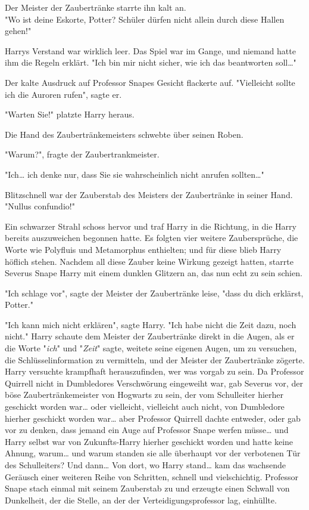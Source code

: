 {Der Meister der Zaubertränke starrte ihn kalt an.\\ "Wo ist deine Eskorte, Potter? Schüler dürfen nicht allein durch diese Hallen gehen!"

Harrys Verstand war wirklich leer. Das Spiel war im Gange, und niemand hatte ihm die Regeln erklärt. "Ich bin mir nicht sicher, wie ich das beantworten soll…"

Der kalte Ausdruck auf Professor Snapes Gesicht flackerte auf. "Vielleicht sollte ich die Auroren rufen", sagte er.

"Warten Sie!" platzte Harry heraus.

Die Hand des Zaubertränkemeisters schwebte über seinen Roben.

"Warum?", fragte der Zaubertrankmeister.

"Ich… ich denke nur, dass Sie sie wahrscheinlich nicht anrufen sollten…"

Blitzschnell war der Zauberstab des Meisters der Zaubertränke in seiner Hand.\\ "Nullus confundio!"

Ein schwarzer Strahl schoss hervor und traf Harry in die Richtung, in die Harry bereits auszuweichen begonnen hatte. Es folgten vier weitere Zaubersprüche, die Worte wie Polyfluis und Metamorphus enthielten; und für diese blieb Harry höflich stehen. Nachdem all diese Zauber keine Wirkung gezeigt hatten, starrte Severus Snape Harry mit einem dunklen Glitzern an, das nun echt zu sein schien.

"Ich schlage vor", sagte der Meister der Zaubertränke leise, "dass du dich erklärst, Potter."

"Ich kann mich nicht erklären", sagte Harry. "Ich habe nicht die Zeit dazu, noch nicht." Harry schaute dem Meister der Zaubertränke direkt in die Augen, als er die Worte "\emph{ich}" und "\emph{Zeit}" sagte, weitete seine eigenen Augen, um zu versuchen, die Schlüsselinformation zu vermitteln, und der Meister der Zaubertränke zögerte.\\ Harry versuchte krampfhaft herauszufinden, wer was vorgab zu sein. Da Professor Quirrell nicht in Dumbledores Verschwörung eingeweiht war, gab Severus vor, der böse Zaubertränkemeister von Hogwarts zu sein, der vom Schulleiter hierher geschickt worden war… oder vielleicht, vielleicht auch nicht, von Dumbledore hierher geschickt worden war… aber Professor Quirrell dachte entweder, oder gab vor zu denken, dass jemand ein Auge auf Professor Snape werfen müsse… und Harry selbst war von Zukunfts-Harry hierher geschickt worden und hatte keine Ahnung, warum… und warum standen sie alle überhaupt vor der verbotenen Tür des Schulleiters? Und dann… Von dort, wo Harry stand… kam das wachsende Geräusch einer weiteren Reihe von Schritten, schnell und vielschichtig. Professor Snape stach einmal mit seinem Zauberstab zu und erzeugte einen Schwall von Dunkelheit, der die Stelle, an der der Verteidigungsprofessor lag, einhüllte.

}
